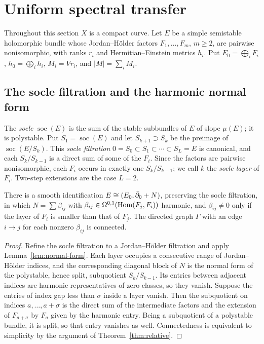 \section{Uniform spectral transfer}\label{sec:transfer}

Throughout this section $X$ is a compact curve. Let $E$ be a simple
semistable holomorphic bundle whose Jordan--H\"older factors
$F_1,\ldots,F_m$, $m\ge2$, are pairwise nonisomorphic, with ranks $r_i$
and Hermitian--Einstein metrics $h_i$. Put $E_0=\bigoplus_iF_i$,
$h_0=\bigoplus_ih_i$, $M_i=Vr_i$, and $|M|=\sum_iM_i$.

\subsection{The socle filtration and the harmonic normal form}

The \emph{socle} $\operatorname{soc}(E)$ is the sum of the stable
subbundles of $E$ of slope $\mu(E)$; it is polystable. Put
$S_1=\operatorname{soc}(E)$ and let $S_{k+1}\supset S_k$ be the preimage
of $\operatorname{soc}(E/S_k)$. This \emph{socle filtration}
$0=S_0\subset S_1\subset\cdots\subset S_L=E$ is canonical, and each
$S_k/S_{k-1}$ is a direct sum of some of the $F_i$. Since the factors are
pairwise nonisomorphic, each $F_i$ occurs in exactly one
$S_{k}/S_{k-1}$; we call $k$ the \emph{socle layer} of $F_i$. Two-step
extensions are the case $L=2$.

\begin{lemma}\label{lem:socle-normal-form}
There is a smooth identification $E\cong(E_0,\bar\partial_0+N)$, preserving the
socle filtration, in which $N=\sum\beta_{ij}$ with
$\beta_{ij}\in\Omega^{0,1}(\operatorname{Hom}(F_j,F_i))$ harmonic, and $\beta_{ij}\ne0$
only if the layer of $F_i$ is smaller than that of $F_j$. The directed
graph $\Gamma$ with an edge $i\to j$ for each nonzero $\beta_{ij}$ is
connected.
\end{lemma}

\begin{proof}
Refine the socle filtration to a Jordan--H\"older filtration and apply
Lemma~\ref{lem:normal-form}. Each layer occupies a consecutive range of
Jordan--H\"older indices, and the corresponding diagonal block of $N$ is
the normal form of the polystable, hence split, subquotient
$S_k/S_{k-1}$. Its entries between adjacent indices are harmonic
representatives of zero classes, so they vanish. Suppose the entries of
index gap less than $\sigma$ inside a layer vanish. Then the subquotient
on indices $a,\ldots,a+\sigma$ is the direct sum of the intermediate
factors and the extension of $F_{a+\sigma}$ by $F_a$ given by the harmonic
entry. Being a subquotient of a polystable bundle, it is split, so that
entry vanishes as well. Connectedness is equivalent to simplicity by the
argument of Theorem~\ref{thm:relative}.
\end{proof}

